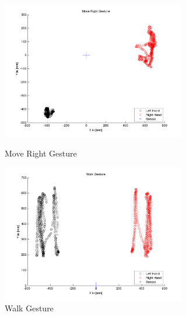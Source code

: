 \begin{figure}
\begin{minipage}
		{.45 
		\textwidth}  
		\centering
		\includegraphics[height=60mm]{figures/result/train-move-right.jpg} \caption*{Move Right Gesture} 
	\end{minipage}
	\begin{minipage}
		{.45 
		\textwidth}  
		\centering
		\includegraphics[height=60mm]{figures/result/train-walk.jpg} \caption*{Walk Gesture} 
	\end{minipage}	
\label{fg:ges:plot}
\end{figure}


